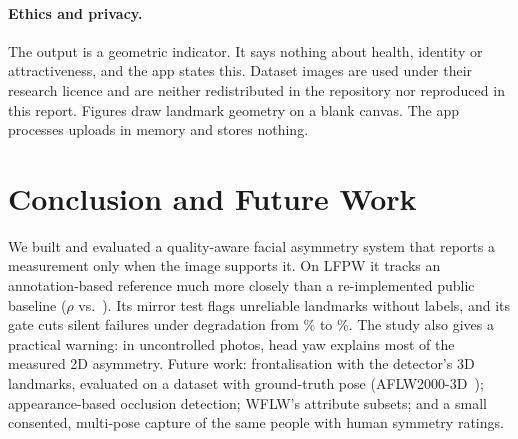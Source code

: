 \paragraph{Ethics and privacy.}
\label{sec:ethics}
The output is a geometric indicator. It says nothing about health, identity or
attractiveness, and the app states this. Dataset images are used under their research
licence and are neither redistributed in the repository nor reproduced in this report.
Figures draw landmark geometry on a blank canvas. The app processes uploads in memory and
stores nothing.

\section{Conclusion and Future Work}
We built and evaluated a quality-aware facial asymmetry system that reports a measurement
only when the image supports it. On LFPW it tracks an annotation-based reference much more
closely than a re-implemented public baseline ($\rho$ \rhoMthree{} vs.\ \rhoMzero{}). Its
mirror test flags unreliable landmarks without labels, and its gate cuts silent failures
under degradation from \silentPoolOne\% to \silentPoolThree\%. The study also gives a
practical warning: in uncontrolled photos, head yaw explains most of the measured 2D
asymmetry. Future work: frontalisation with the detector's 3D landmarks, evaluated on a
dataset with ground-truth pose (\eg AFLW2000-3D~\cite{zhu2016aflw2000}); appearance-based
occlusion detection; WFLW's attribute subsets; and a small consented, multi-pose capture of
the same people with human symmetry ratings.

